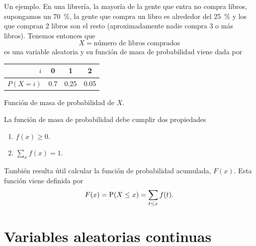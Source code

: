 Un ejemplo. En una librería, la mayoría de la gente que entra no compra libros, supongamos un \qty{70}{\percent}, la gente que compra un libro es alrededor del \qty{25}{\percent} y los que compran 2 libros son el resto (aproximadamente nadie compra 3 o más libros). Tenemos entonces que \[X = \text{número de libros comprados}\] es una variable aleatoria y su función de masa de probabilidad viene dada por 
\begin{center}
\begin{tabular}{rSSS}
\toprule
\(i\) & {0} & {1} & {2}\\
\midrule
\(P(X=i)\) & 0.7 & 0.25 & 0.05\\
\bottomrule
\end{tabular}
\end{center}

\begin{marginfigure}[-4.5cm]
\centering
{}
\caption{Función de masa de probabilidad de \(X\).}
\label{fig:pmf_books}
\end{marginfigure}

La función de masa de probabilidad debe cumplir dos propiedades
\begin{enumerate}
  \item \(f(x) \geq 0\).
  \item \(\sum_{x}f(x)=1\).
\end{enumerate}

También resulta útil calcular la función de probabilidad acumulada, \(F(x)\). Esta función viene definida por \[F(x) = \operatorname{P}(X\leq x) = \sum_{t\leq x}f(t).\]

\newpage\section{Variables aleatorias continuas}

